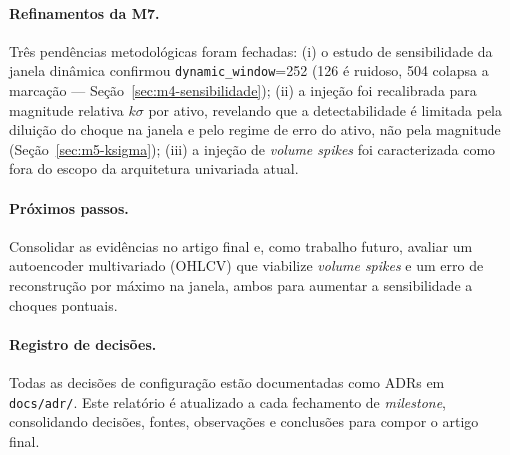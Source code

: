 \paragraph{Refinamentos da M7.} Três pendências metodológicas foram fechadas: (i) o estudo de
sensibilidade da janela dinâmica confirmou \texttt{dynamic\_window}=252 (126 é ruidoso, 504
colapsa a marcação --- Seção~\ref{sec:m4-sensibilidade}); (ii) a injeção foi recalibrada para
magnitude relativa $k\sigma$ por ativo, revelando que a detectabilidade é limitada pela
diluição do choque na janela e pelo regime de erro do ativo, não pela magnitude
(Seção~\ref{sec:m5-ksigma}); (iii) a injeção de \emph{volume spikes} foi caracterizada como
fora do escopo da arquitetura univariada atual.

\paragraph{Próximos passos.} Consolidar as evidências no artigo final e, como trabalho futuro,
avaliar um autoencoder multivariado (OHLCV) que viabilize \emph{volume spikes} e um erro de
reconstrução por máximo na janela, ambos para aumentar a sensibilidade a choques pontuais.

\paragraph{Registro de decisões.} Todas as decisões de configuração estão documentadas
como ADRs em \texttt{docs/adr/}. Este relatório é atualizado a cada fechamento de
\emph{milestone}, consolidando decisões, fontes, observações e conclusões para compor o
artigo final.
